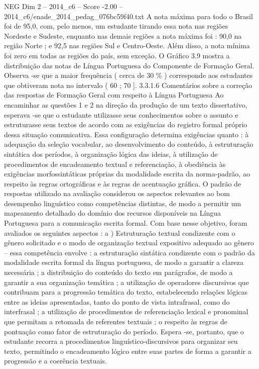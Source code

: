 \begin{textsample}{NEG Dim 2 – 2014\_c6 – Score -2.00 – 2014\_c6/enade\_2014\_pedag\_076bc59f40.txt}
A nota máxima para todo o Brasil foi de 95,0, com, pelo menos, um estudante tirando essa nota nas regiões Nordeste e Sudeste, enquanto nas demais regiões a nota máxima foi : 90,0 na região Norte ; e 92,5 nas regiões Sul e Centro-Oeste.
Além disso, a nota mínima foi zero em todas as regiões do país, sem exceção.
O Gráfico 3.9 mostra a distribuição das notas de Língua Portuguesa do Componente de Formação Geral.
Observa -se que a maior frequência ( cerca de 30 \% ) corresponde aos estudantes que obtiveram nota no intervalo ( 60 ; 70 ]. 3.3.1.6 Comentários sobre a correção das respostas de Formação Geral com respeito à Língua Portuguesa Ao encaminhar as questões 1 e 2 na direção da produção de um texto dissertativo, esperava -se que o estudante utilizasse seus conhecimentos sobre o assunto e estruturasse seus textos de acordo com as exigências do registro formal próprio dessa situação comunicativa.
Essa configuração determina exigências quanto : à adequação da seleção vocabular, ao desenvolvimento do conteúdo, à estruturação sintática dos períodos, à organização lógica das ideias, à utilização de procedimentos de encadeamento textual e referenciação, à obediência às exigências morfossintáticas próprias da modalidade escrita da norma-padrão, ao respeito às regras ortográficas e às regras de acentuação gráfica.
O padrão de respostas utilizado na avaliação considerou os aspectos relevantes ao bom desempenho linguístico como competências distintas, de modo a permitir um mapeamento detalhado do domínio dos recursos disponíveis na Língua Portuguesa para a comunicação escrita formal.
Com base nesse objetivo, foram avaliados os seguintes aspectos : a ) Estruturação textual condizente com o gênero solicitado e o modo de organização textual expositivo adequado ao gênero – essa competência envolve : a estruturação sintática condizente com o padrão da modalidade escrita formal da língua portuguesa, de modo a garantir a clareza necessária ; a distribuição do conteúdo do texto em parágrafos, de modo a garantir a sua organização temática ; a utilização de operadores discursivos que contribuam para a progressão temática do texto, estabelecendo relações lógicas entre as ideias apresentadas, tanto do ponto de vista intrafrasal, como do interfrasal ; a utilização de procedimentos de referenciação lexical e pronominal que permitam a retomada de referentes textuais ; o respeito às regras de pontuação como fator de estruturação do período.
Espera -se, portanto, que o estudante recorra a procedimentos linguístico-discursivos para organizar seu texto, permitindo o encadeamento lógico entre suas partes de forma a garantir a progressão e a coerência textuais.

\end{textsample}
